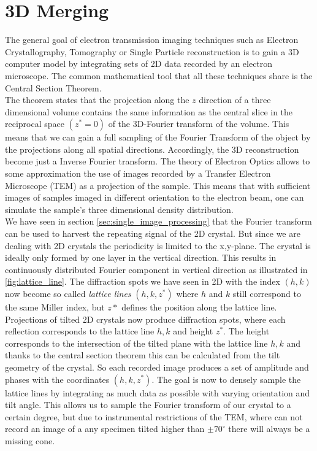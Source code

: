 \section{3D Merging}
\label{3d_merigng}

 
The general goal of electron transmission imaging techniques such as Electron Crystallography, Tomography or Single Particle reconstruction is to gain a 3D computer model by integrating sets of 2D data recorded by an electron microscope. The common mathematical tool that all these techniques share is the Central Section Theorem. \\
The theorem states that the projection along the $z$ direction of a three dimensional volume contains the same information as the central slice in the reciprocal space $(z^*=0)$ of the 3D-Fourier transform of the volume. This means that we can gain a full sampling of the Fourier Transform of the object by the projections along all spatial directions. Accordingly, the 3D reconstruction become just a Inverse Fourier transform. The theory of Electron Optics allows to some approximation the use of images recorded by a Transfer Electron Microscope (TEM) as a projection of the sample. This means that with sufficient images of samples imaged in different orientation to the electron beam, one can simulate the sample's three dimensional density distribution. \\
We have seen in section \autoref{sec:single_image_processing} that the Fourier transform can be used to harvest the repeating signal of the 2D crystal. But since we are dealing with 2D crystals the periodicity is limited to the x,y-plane. The crystal is ideally only formed by one layer in the vertical direction. This results in continuously distributed Fourier component in vertical direction as illustrated in \autoref{fig:lattice_line}. The diffraction spots we have seen in 2D with the index 
$(h,k)$ now become so called \textit{lattice lines} $(h,k,z^*)$ where $h$ and $k$ still correspond to the same Miller index, but $z*$ defines the position along the lattice line. \\
Projections of tilted 2D crystals now produce diffraction spots, where each reflection corresponds to the lattice line $h,k$ and height $z^*$. The height corresponds to the intersection of the tilted plane with the lattice line $h,k$ and thanks to the central section theorem this can be calculated from the tilt geometry of the crystal. So each recorded image produces a set of amplitude and phases with the coordinates $(h,k,z^*)$. The goal is now to densely sample the lattice lines by integrating as much data as possible with varying orientation and tilt angle. This allows us to sample the Fourier transform of our crystal to a certain degree, but due to instrumental restrictions of the TEM, where can not record an image of a any specimen tilted higher than $\pm 70^{\circ}$ there will always be a missing cone.
	
